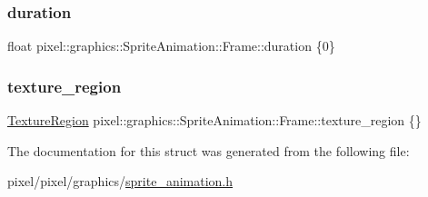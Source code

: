 \subsubsection{\texorpdfstring{duration}{duration}}
{\footnotesize\ttfamily float pixel\+::graphics\+::\+Sprite\+Animation\+::\+Frame\+::duration \{0\}}

\mbox{\label{structpixel_1_1graphics_1_1_sprite_animation_1_1_frame_af723e632a129c9f9fded4a1b35dd378c}} 
\subsubsection{\texorpdfstring{texture\+\_\+region}{texture\_region}}
{\footnotesize\ttfamily \hyperlink{structpixel_1_1graphics_1_1_texture_region}{Texture\+Region} pixel\+::graphics\+::\+Sprite\+Animation\+::\+Frame\+::texture\+\_\+region \{\}}



The documentation for this struct was generated from the following file\+:\begin{DoxyCompactItemize}
\item 
pixel/pixel/graphics/\hyperlink{sprite__animation_8h}{sprite\+\_\+animation.\+h}\end{DoxyCompactItemize}
